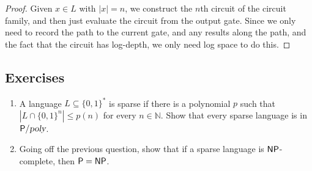 \begin{proof}
Given $x \in L$ with $|x| = n$, we construct the $n$th circuit of the circuit family, and then just evaluate the circuit from the output gate. Since we only need to record the path to the current gate, and any results along the path, and the fact that the circuit has log-depth, we only need log space to do this.
\end{proof}

\subsection*{Exercises}

\begin{enumerate}
\item A language $L \subseteq \{0, 1\}^*$ is sparse if there is a polynomial $p$ such that $|L \cap \{0, 1\}^n| \le p(n)$ for every $n \in \mathbb{N}$. Show that every sparse language is in ${\mathsf{P}}/{\textsl{poly}}$.
\item Going off the previous question, show that if a sparse language is ${\mathsf{NP}}$-complete, then ${\mathsf{P}} = {\mathsf{NP}}$.
\end{enumerate}